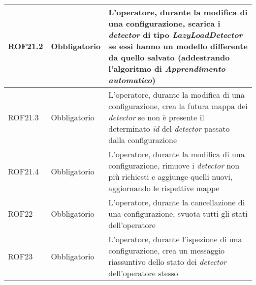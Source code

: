 {\begin{longtable}{L{3cm} L{3cm} L{7.5cm}}
\hline
ROF21.2 & Obbligatorio & L'operatore, durante la modifica di una configurazione, scarica i \textit{detector} di tipo \textit{LazyLoadDetector} se essi hanno un modello differente da quello salvato (addestrando l'algoritmo di \textit{\gls{Apprendimento automatico}}) \\
\hline
ROF21.3 & Obbligatorio & L'operatore, durante la modifica di una configurazione, crea la futura mappa dei \textit{detector} se non è presente il determinato \textit{id} del \textit{detector} passato dalla configurazione\\
\hline
ROF21.4 & Obbligatorio & L'operatore, durante la modifica di una configurazione, rimuove i \textit{detector} non più richiesti e aggiunge quelli nuovi, aggiornando le rispettive mappe\\
\hline
ROF22 & Obbligatorio & L'operatore, durante la cancellazione di una configurazione, svuota tutti gli stati dell'operatore\\
\hline
ROF23 & Obbligatorio & L'operatore, durante l'ispezione di una configurazione, crea un messaggio riassuntivo dello stato dei \textit{detector} dell'operatore stesso\\
\hline
\end{longtable}
}

